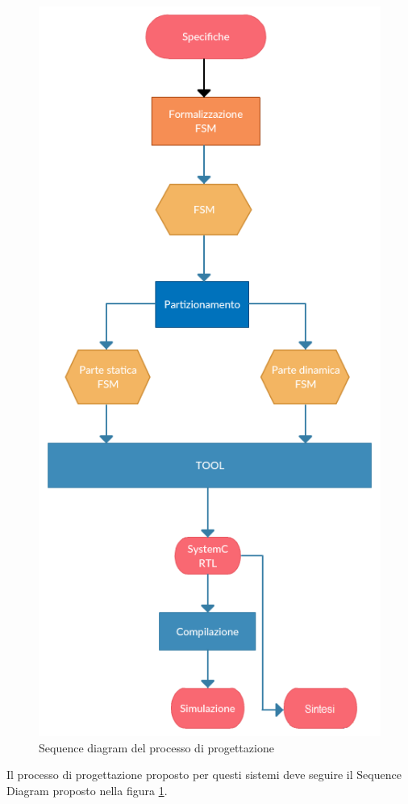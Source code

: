 \documentclass[a4paper,titlepage]{book}
\begin{document}
\begin{figure}[!hb]
\centering
\includegraphics[scale=0.75]{processo.png}
\caption{Sequence diagram del processo di progettazione}\label{fig:7}
\end{figure}

Il processo di progettazione proposto per questi sistemi deve seguire il Sequence Diagram proposto nella figura \ref{fig:7}.
\end{document}
